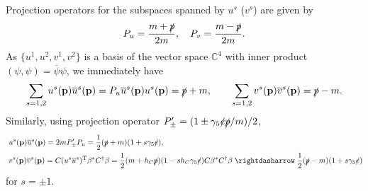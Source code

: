 \documentclass[CheatSheet]{subfiles}
\begin{document}
Projection operators for the subspaces spanned by $u^s$ ($v^s$) are given by
\begin{equation}
 P_u=\frac{m+\slashed p}{2m}, \quad P_v=\frac{m-\slashed p}{2m}.
\end{equation}
As $\{u^1, u^2, v^1, v^2\}$ is a basis of the vector space $\mathbb C^4$ with inner product $(\psi,\psi)=\overline\psi\psi$, we immediately have 
\begin{equation}
 \sum_{s=1,2}u^s({\mathbf{p}})\overline u^s({\mathbf{p}})=P_u \overline u^s({\mathbf{p}})u^s({\mathbf{p}}) = \slashed p+m,\qquad
 \sum_{s=1,2}v^s({\mathbf{p}})\overline v^s({\mathbf{p}})=\slashed p-m.
\end{equation}
Similarly, using projection operator $P'_{\pm}=(1\pm\gamma_5\slashed e\slashed p/m)/2$,
\begin{align}
 &u^s(\vc p)\overline u^s(\vc p) = 2m P'_{\pm}P_u = \frac12(\slashed p+m)(1+s\gamma_5\slashed e),\\\
 &v^s(\vc p)\overline v^s(\vc p) = C(u^s\overline u^s)^\TT \beta^*C^\dagger\beta
=\frac12(m+h_C \slashed p)(1-s h_C \gamma_5\slashed e )C\beta^*C^\dagger \beta
\leadsto
\frac12(\slashed p-m)(1+s\gamma_5\slashed e)
\end{align}
for $s=\pm1$.
\end{document}
